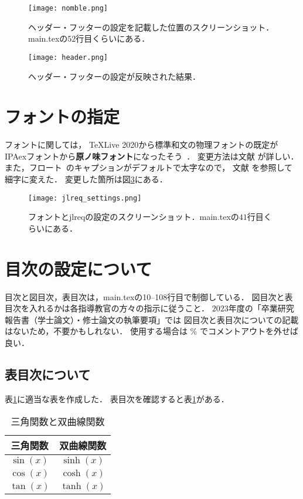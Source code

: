 \begin{figure}[h]
  \centering
  \texttt{[image: nomble.png]}
  \caption{ヘッダー・フッターの設定を記載した位置のスクリーンショット．main.texの$52$行目くらいにある．}
  \label{fig:nomble}
\end{figure}
\begin{figure}[h]
  \centering
  \texttt{[image: header.png]}
  \caption{ヘッダー・フッターの設定が反映された結果．}
  \label{fig:header}
\end{figure}


\section{フォントの指定}
フォントに関しては，
\TeX Live 2020から標準和文の物理フォントの既定が
IPAexフォントから\textbf{\textsf{原ノ味フォント}}になったそう~\cite{font}．
変更方法は文献 \cite{font} が詳しい．
また，フロート~\cite{float}のキャプションがデフォルトで太字なので，
文献 \cite{jlreq} を参照して細字に変えた．
変更した箇所は図\ref{fig:jlreqset}にある．

\begin{figure}[h]
  \centering
  \texttt{[image: jlreq\_settings.png]}
  \caption{フォントとjlreqの設定のスクリーンショット．main.texの$41$行目くらいにある．}
  \label{fig:jlreqset}
\end{figure}


\section{目次の設定について}
目次と図目次，表目次は，main.texの10--108行目で制御している．
図目次と表目次を入れるかは各指導教官の方々の指示に従うこと．
$2023$年度の「卒業研究報告書（学士論文）・修士論文の執筆要項」では
図目次と表目次についての記載はないため，不要かもしれない．
使用する場合は \% でコメントアウトを外せば良い．

\subsection{表目次について}
表\ref{tab:triangle}に適当な表を作成した．
表目次を確認すると表\ref{tab:triangle}がある．

\begin{table}[htbp]
  \centering
  \caption{三角関数と双曲線関数}
  \begin{tabular}{cc} \toprule 
    三角関数 & 双曲線関数 \\ \hline
    $\sin(x)$ & $\sinh(x)$ \\
    $\cos(x)$ & $\cosh(x)$ \\
    $\tan(x)$ & $\tanh(x)$ \\ \hline
  \end{tabular}
  \label{tab:triangle}
\end{table}


